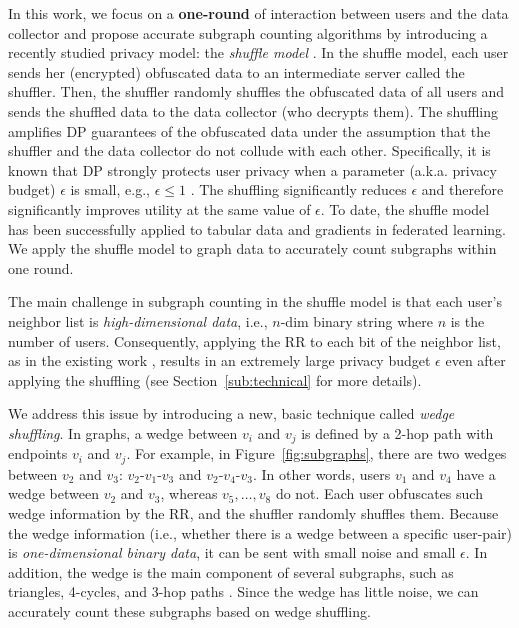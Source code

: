 In this work, we focus on a \textbf{one-round} of interaction between users and the data collector and propose accurate subgraph counting algorithms by introducing a recently studied privacy model: the \textit{shuffle model} \cite{Erlingsson_SODA19,Feldman_FOCS21}. 
In the shuffle model, each user sends her (encrypted) obfuscated data to an intermediate server called the shuffler. 
Then, the shuffler randomly shuffles the obfuscated data of all users and sends the shuffled data to the data collector (who decrypts them). 
The shuffling amplifies DP guarantees of the obfuscated data under the assumption that the shuffler and the data collector do not collude with each other. 
Specifically, it is known that DP strongly protects user privacy when a parameter (a.k.a. privacy budget) $\epsilon$ is small, e.g., $\epsilon \leq 1$ \cite{DP_Li}. 
The shuffling significantly reduces $\epsilon$ and therefore significantly improves utility at the same value of $\epsilon$. 
To date, the shuffle model has been successfully applied to tabular data \cite{Meehan_ICLR22,Wang_PVLDB20} and 
gradients \cite{Girgis_AISTATS21,Liu_AAAI21} in federated learning. 
We 
apply the shuffle model to graph data to accurately count subgraphs within one round. 

The main challenge in subgraph counting in the shuffle model is that each user's neighbor list is \textit{high-dimensional data}, i.e., $n$-dim binary string where $n$ is the number of users. 
Consequently, applying the RR to each bit of the neighbor list, as in the existing work \cite{Imola_USENIX21,Imola_USENIX22,Ye_ICDE20,Ye_TKDE21}, results in an extremely large privacy budget $\epsilon$ even after applying the shuffling (see Section~\ref{sub:technical} for more details). 

We address this issue by introducing a new, basic technique called \textit{wedge shuffling}. 
In graphs, a wedge between $v_i$ and $v_j$ is defined by a 2-hop path with endpoints $v_i$ and $v_j$. 
For example, in Figure~\ref{fig:subgraphs}, 
there are two wedges between $v_2$ and $v_3$: $v_2$-$v_1$-$v_3$ and $v_2$-$v_4$-$v_3$. 
In other words, users $v_1$ and $v_4$ have a wedge between $v_2$ and $v_3$, whereas $v_5, \ldots, v_8$ do not. 
Each user obfuscates such wedge information by the RR, and the shuffler randomly shuffles them. 
Because the wedge information (i.e., whether there is a wedge between a specific user-pair) 
is \textit{one-dimensional binary data}, it can be sent with small noise and small $\epsilon$. 
In addition, the wedge is the main component of several subgraphs, such as triangles, 4-cycles, and 3-hop paths \cite{Sun_CCS19}. 
Since the wedge has little noise, we can accurately count these subgraphs based on wedge shuffling. 

